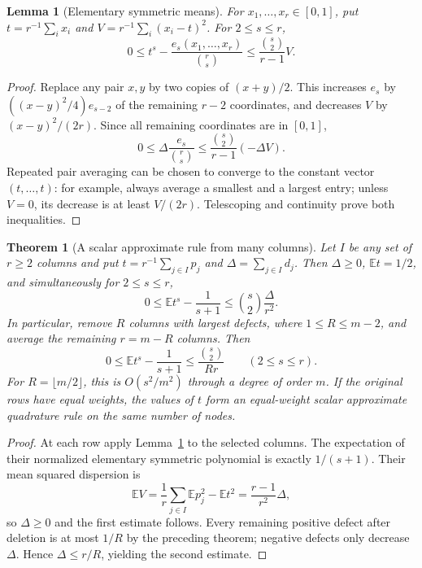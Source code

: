 \documentclass[11pt]{article}
\newtheorem{theorem}{Theorem}
\newtheorem{lemma}{Lemma}
\newcommand{\E}{\mathbb E}
\begin{document}
\begin{lemma}[Elementary symmetric means]\label{sampling}
For $x_1,\ldots,x_r\in[0,1]$, put
$t=r^{-1}\sum_i x_i$ and $V=r^{-1}\sum_i(x_i-t)^2$.
For $2\le s\le r$,
\[
 0\le t^s-\frac{e_s(x_1,\ldots,x_r)}{\binom rs}
 \le\frac{\binom s2}{r-1}V.
\]
\end{lemma}
\begin{proof}
Replace any pair $x,y$ by two copies of $(x+y)/2$. This increases
$e_s$ by $((x-y)^2/4)e_{s-2}$ of the remaining $r-2$ coordinates,
and decreases $V$ by $(x-y)^2/(2r)$. Since all remaining coordinates
are in $[0,1]$,
\[
 0\le\Delta\frac{e_s}{\binom rs}
 \le\frac{\binom s2}{r-1}(-\Delta V).
\]
Repeated pair averaging can be chosen to converge to the constant
vector $(t,\ldots,t)$: for example, always average a smallest and a
largest entry; unless $V=0$, its decrease is at least $V/(2r)$.
Telescoping and continuity prove both inequalities.
\end{proof}

\begin{theorem}[A scalar approximate rule from many columns]\label{approx}
Let $I$ be any set of $r\ge2$ columns and put
$t=r^{-1}\sum_{j\in I}p_j$ and $\Delta=\sum_{j\in I}d_j$.
Then $\Delta\ge0$, $\E t=1/2$, and simultaneously for $2\le s\le r$,
\[
 0\le\E t^s-\frac1{s+1}
 \le\binom s2\frac{\Delta}{r^2}.
\]
In particular, remove $R$ columns with largest defects, where
$1\le R\le m-2$, and average the remaining $r=m-R$ columns.
Then
\[
 0\le\E t^s-\frac1{s+1}
 \le\frac{\binom s2}{Rr}\qquad(2\le s\le r).
\]
For $R=\lfloor m/2\rfloor$, this is $O(s^2/m^2)$ through a degree
of order $m$. If the original rows have equal weights, the values of
$t$ form an equal-weight scalar approximate quadrature rule on the
same number of nodes.
\end{theorem}
\begin{proof}
At each row apply Lemma~\ref{sampling} to the selected columns.
The expectation of their normalized elementary symmetric polynomial
is exactly $1/(s+1)$. Their mean squared dispersion is
\[
 \E V=\frac1r\sum_{j\in I}\E p_j^2-\E t^2
 =\frac{r-1}{r^2}\Delta,
\]
so $\Delta\ge0$ and the first estimate follows. Every remaining
positive defect after deletion is at most $1/R$ by the preceding
theorem; negative defects only decrease $\Delta$. Hence
$\Delta\le r/R$, yielding the second estimate.
\end{proof}
\end{document}
